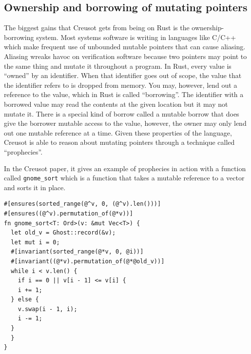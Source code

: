 \documentclass[12pt]{article}
\begin{document}
\subsection{Ownership and borrowing of mutating pointers}
The biggest gains that Creusot gets from being on Rust is the ownership-borrowing system.
Most systems software is writing in languages like C/C++ which make frequent use of unbounded mutable pointers that can cause aliasing.
Aliasing wreaks havoc on verification software because two pointers may point to the same thing and mutate it throughout a program.
In Rust, every value is ``owned'' by an identifier. When that identifier goes out of scope, the value that the identifier refers to is dropped from memory.
You may, however, lend out a reference to the value, which in Rust is called ``borrowing''.
The identifier with a borrowed value may read the contents at the given location but it may not mutate it.
There is a special kind of borrow called a mutable borrow that does give the borrower mutable access to the value, however, the owner may only lend out one mutable reference at a time.
Given these properties of the language, Creusot is able to reason about mutating pointers through a technique called ``prophecies''.

In the Creusot paper, it gives an example of prophecies in action with a function called \texttt{gnome\_sort} which is a function that takes a mutable reference to a vector and sorts it in place.

\begin{verbatim}
#[ensures(sorted_range(@^v, 0, (@^v).len()))]
#[ensures((@^v).permutation_of(@*v))]
fn gnome_sort<T: Ord>(v: &mut Vec<T>) {
  let old_v = Ghost::record(&v);
  let mut i = 0;
  #[invariant(sorted_range(@*v, 0, @i))]
  #[invariant((@*v).permutation_of(@*@old_v))]
  while i < v.len() {
    if i == 0 || v[i - 1] <= v[i] {
    i += 1;
  } else {
    v.swap(i - 1, i);
    i -= 1;
  }
  }
}
\end{verbatim}
\end{document}
